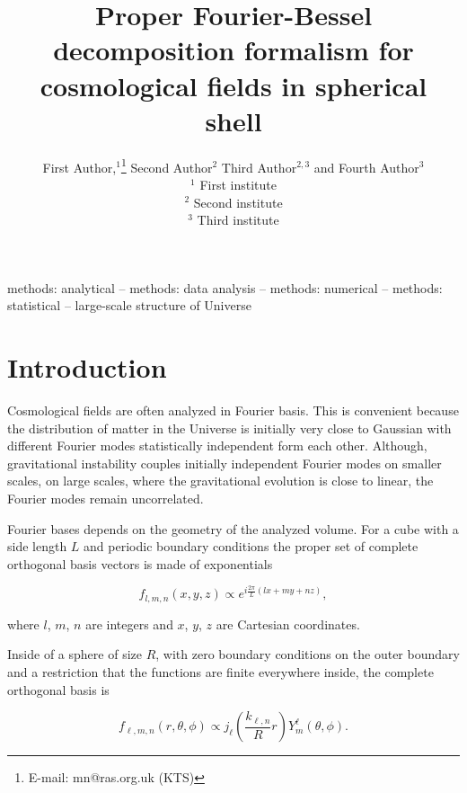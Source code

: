 \documentclass[fleqn,usenatbib]{mnras}
\title[Basis for spherical shells]{Proper Fourier-Bessel decomposition formalism for cosmological fields in spherical shell}
\author[First Author et al.]{
First Author,$^{1}$\thanks{E-mail: mn@ras.org.uk (KTS)}
Second Author$^{2}$
Third Author$^{2,3}$
and Fourth Author$^{3}$
\\
$^{1}$ First institute\\
$^{2}$ Second institute\\
$^{3}$ Third institute
}
\begin{document}
\label{firstpage}
\pagerange{\pageref{firstpage}--\pageref{lastpage}}
\maketitle

\begin{abstract}
\end{abstract}

\begin{keywords}
methods: analytical -- methods: data analysis -- methods: numerical -- methods: statistical -- large-scale structure of Universe
\end{keywords}



\section{Introduction}
Cosmological fields are often analyzed in Fourier basis. This is convenient
because the distribution of matter in the Universe is initially very close to
Gaussian with different Fourier modes statistically independent form each other.
Although, gravitational instability couples initially independent Fourier modes
on smaller scales, on large scales, where the gravitational evolution is close
to linear, the Fourier modes remain uncorrelated.

Fourier bases depends on the geometry of the analyzed volume. For a cube with a
side length $L$ and  periodic boundary conditions the proper set of complete
orthogonal basis vectors is made of exponentials 

\begin{equation}
\label{eq:Fcube}
f_{l,m,n}(x,y,z)\propto e^{i\frac{2\pi}{L}\left(lx + my + nz\right)},
\end{equation}

where $l$, $m$, $n$ are integers and $x$, $y$, $z$ are Cartesian coordinates.

Inside of a sphere of size $R$, with zero boundary conditions on the outer
boundary and a restriction that the functions are finite everywhere inside, the
complete orthogonal basis is

\begin{equation}
\label{eq:Fsphere}
f_{\ell,m,n}(r,\theta,\phi) \propto j_\ell\left(\frac{k_{\ell,n}} {R}r\right)Y^\ell_m
(\theta,\phi).
\end{equation}
\end{document}
